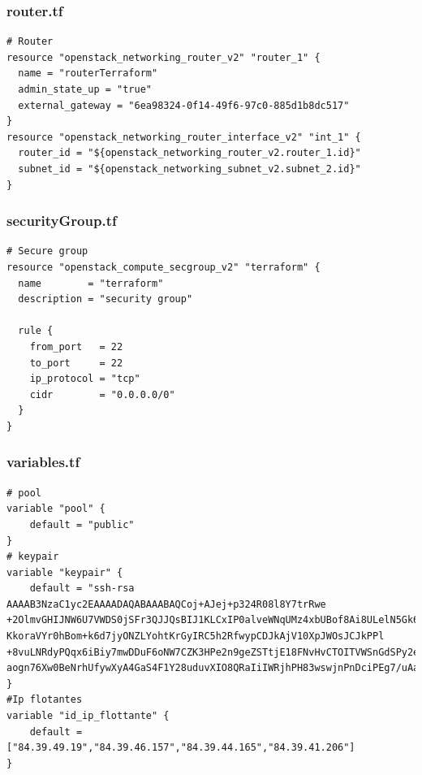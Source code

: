 \documentclass[]{article}
\begin{document}
\subsubsection*{router.tf}
\begin{verbatim}
# Router
resource "openstack_networking_router_v2" "router_1" {
  name = "routerTerraform"
  admin_state_up = "true"
  external_gateway = "6ea98324-0f14-49f6-97c0-885d1b8dc517"
}
resource "openstack_networking_router_interface_v2" "int_1" {
  router_id = "${openstack_networking_router_v2.router_1.id}"
  subnet_id = "${openstack_networking_subnet_v2.subnet_2.id}"
}
\end{verbatim}
\subsubsection*{securityGroup.tf}
\begin{verbatim}
# Secure group
resource "openstack_compute_secgroup_v2" "terraform" {
  name        = "terraform"
  description = "security group"
  
  rule {
    from_port   = 22
    to_port     = 22
    ip_protocol = "tcp"
    cidr        = "0.0.0.0/0"
  }
}
\end{verbatim}
\subsubsection*{variables.tf}
\begin{verbatim}
# pool
variable "pool" {
    default = "public"
}
# keypair
variable "keypair" {
    default = "ssh-rsa AAAAB3NzaC1yc2EAAAADAQABAAABAQCoj+AJej+p324R08l8Y7trRwe
+2OlmvGHIJNW6U7VWDS0jSFr3QJJQsBIJ1KLCxIP0alveWNqUMz4xbUBof8Ai8ULelN5Gk64EsRmkH2Bncxs
KkoraVYr0hBom+k6d7jyONZLYohtKrGyIRC5h2RfwypCDJkAjV10XpJWOsJCJkPPl
+8vuLNRdyPQqx6iBiy7mwDDuF6oNW7CZK3HPe2n9geZSTtjE18FNvHvCTOITVWSnGdSPy2e89ahemM0B3ROo
aogn76Xw0BeNrhUfywXyA4GaS4F1Y28uduvXIO8QRaIiIWRjhPH83wswjnPnDciPEg7/uAa/yZSy1SXFU5V"
}
#Ip flotantes
variable "id_ip_flottante" { 
    default = ["84.39.49.19","84.39.46.157","84.39.44.165","84.39.41.206"]
} 
\end{verbatim}
\end{document}
